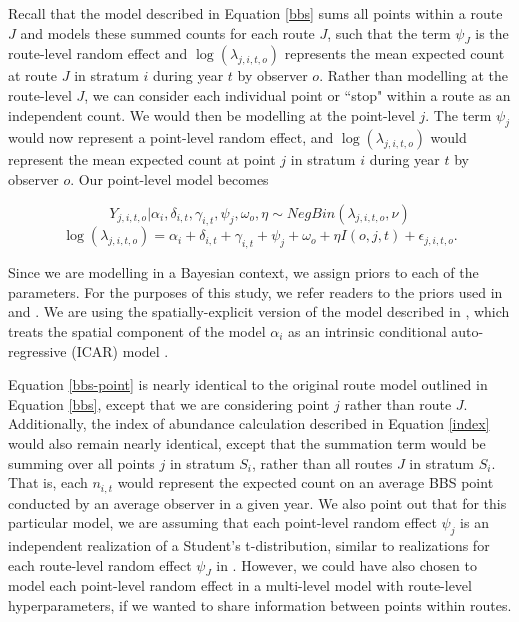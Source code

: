 \documentclass[12pt]{article}
\begin{document}
\par Recall that the model described in Equation \ref{bbs} sums all points within a route $J$ and models these summed counts for each route $J$, such that the term $\psi_J$ is the route-level random effect and $\log(\lambda_{j,i,t,o})$ represents the mean expected count at route $J$ in stratum $i$ during year $t$ by observer $o$.
Rather than modelling at the route-level $J$, we can consider each individual point or ``stop" within a route as an independent count.
We would then be modelling at the point-level $j$.
The term $\psi_j$ would now represent a point-level random effect, and $\log(\lambda_{j,i,t,o})$ would represent the mean expected count at point $j$ in stratum $i$ during year $t$ by observer $o$. 
Our point-level model becomes

\begin{equation*}
	Y_{j,i,t,o} | \alpha_i, \delta_{i,t}, \gamma_{i,t}, \psi_j, \omega_o, \eta \sim NegBin(\lambda_{j,i,t,o}, \nu)
\end{equation*}
\begin{equation}\label{bbs-point}
	\log(\lambda_{j,i,t,o}) = \alpha_i + \delta_{i,t} + \gamma_{i,t} + \psi_j + \omega_o + \eta I(o,j,t) + \epsilon_{j,i,t,o}.
\end{equation}

Since we are modelling in a Bayesian context, we assign priors to each of the parameters. 
For the purposes of this study, we refer readers to the priors used in \citet{smith_north_2021} and \citet{smith_spatially_2023}.
We are using the spatially-explicit version of the model described in \citet{smith_spatially_2023}, which treats the spatial component of the model $\alpha_i$ as an intrinsic conditional auto-regressive (ICAR) model \citep{besag_bayesian_1991}.

\par Equation \ref{bbs-point} is nearly identical to the original route model outlined in Equation \ref{bbs}, except that we are considering point $j$ rather than route $J$.
Additionally, the index of abundance calculation described in Equation \ref{index} would also remain nearly identical, except that the summation term would be summing over all points $j$ in stratum $S_i$, rather than all routes $J$ in stratum $S_i$. 
That is, each $n_{i,t}$ would represent the expected count on an average BBS point conducted by an average observer in a given year.
We also point out that for this particular model, we are assuming that each point-level random effect $\psi_j$ is an independent realization of a Student's t-distribution, similar to realizations for each route-level random effect $\psi_J$ in \citet{smith_north_2021, smith_spatially_2023}.
However, we could have also chosen to model each point-level random effect in a multi-level model with route-level hyperparameters, if we wanted to share information between points within routes.
\end{document}
